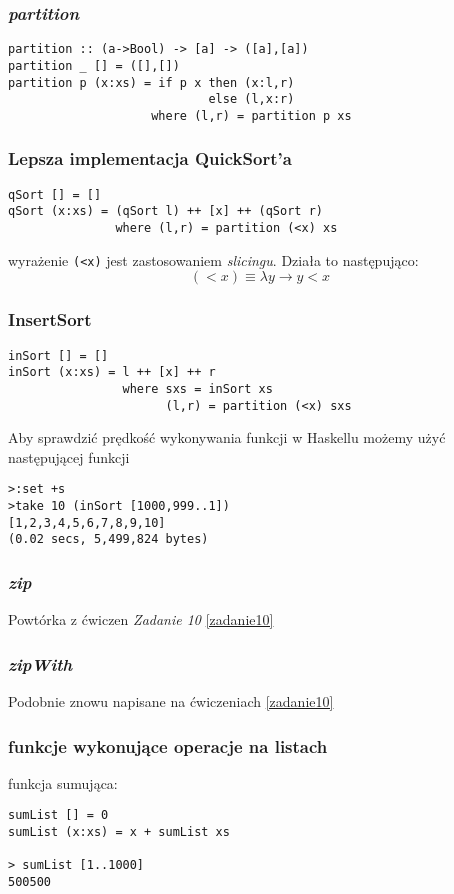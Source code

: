 \documentclass[11pt,a4paper]{article}
\begin{document}
\subsubsection{\textit{partition}}
\begin{Verbatim}[frame=single]
partition :: (a->Bool) -> [a] -> ([a],[a])
partition _ [] = ([],[])
partition p (x:xs) = if p x then (x:l,r)
                            else (l,x:r)
                    where (l,r) = partition p xs
\end{Verbatim}

\subsubsection{Lepsza implementacja QuickSort'a}
\begin{Verbatim}[frame=single]
qSort [] = []
qSort (x:xs) = (qSort l) ++ [x] ++ (qSort r)
               where (l,r) = partition (<x) xs
\end{Verbatim}
wyrażenie \texttt{(<x)} jest zastosowaniem \textit{slicingu}. Działa to następująco:
\[
    (<x) \equiv \lambda y \rightarrow y < x
\]

\subsubsection{InsertSort}
\begin{Verbatim}[frame=single]
inSort [] = []
inSort (x:xs) = l ++ [x] ++ r
                where sxs = inSort xs
                      (l,r) = partition (<x) sxs
\end{Verbatim}

Aby sprawdzić prędkość wykonywania funkcji w Haskellu możemy użyć następującej funkcji
\begin{Verbatim}[frame=single]
>:set +s
>take 10 (inSort [1000,999..1])
[1,2,3,4,5,6,7,8,9,10]
(0.02 secs, 5,499,824 bytes)
\end{Verbatim}

\subsubsection{\textit{zip}}
Powtórka z ćwiczen \textit{Zadanie 10} \ref{zadanie10}
\subsubsection{\textit{zipWith}}
Podobnie znowu napisane na ćwiczeniach \ref{zadanie10}

\subsubsection{funkcje wykonujące operacje na listach}
funkcja sumująca:
\begin{Verbatim}[frame=single]
sumList [] = 0
sumList (x:xs) = x + sumList xs

> sumList [1..1000]
500500
\end{Verbatim}
\end{document}
